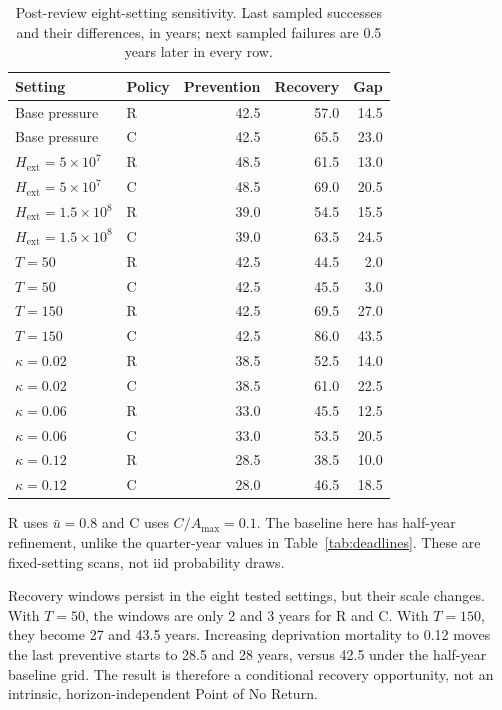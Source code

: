 \documentclass[12pt,a4paper]{article}
\theoremstyle{remark}
\newcommand{\Hext}{H_{\mathrm{ext}}}
\begin{document}
\begin{table}[htbp]\centering\small
\caption{Post-review eight-setting sensitivity. Last sampled successes and their differences, in years; next sampled failures are 0.5 years later in every row.}\label{tab:reviewsensitivity}
\begin{tabular}{@{}llrrr@{}}\toprule
Setting & Policy & Prevention & Recovery & Gap\\\midrule
Base pressure & R & 42.5 & 57.0 & 14.5\\
Base pressure & C & 42.5 & 65.5 & 23.0\\
$\Hext=5\times10^7$ & R & 48.5 & 61.5 & 13.0\\
$\Hext=5\times10^7$ & C & 48.5 & 69.0 & 20.5\\
$\Hext=1.5\times10^8$ & R & 39.0 & 54.5 & 15.5\\
$\Hext=1.5\times10^8$ & C & 39.0 & 63.5 & 24.5\\
$T=50$ & R & 42.5 & 44.5 & 2.0\\
$T=50$ & C & 42.5 & 45.5 & 3.0\\
$T=150$ & R & 42.5 & 69.5 & 27.0\\
$T=150$ & C & 42.5 & 86.0 & 43.5\\
$\kappa=0.02$ & R & 38.5 & 52.5 & 14.0\\
$\kappa=0.02$ & C & 38.5 & 61.0 & 22.5\\
$\kappa=0.06$ & R & 33.0 & 45.5 & 12.5\\
$\kappa=0.06$ & C & 33.0 & 53.5 & 20.5\\
$\kappa=0.12$ & R & 28.5 & 38.5 & 10.0\\
$\kappa=0.12$ & C & 28.0 & 46.5 & 18.5\\
\bottomrule\end{tabular}
\par\smallskip\begin{minipage}{0.96\linewidth}\footnotesize R uses $\bar u=0.8$ and C uses $C/A_{\max}=0.1$. The baseline here has half-year refinement, unlike the quarter-year values in Table~\ref{tab:deadlines}. These are fixed-setting scans, not iid probability draws.\end{minipage}
\end{table}

Recovery windows persist in the eight tested settings, but their scale changes. With $T=50$, the windows are only 2 and 3 years for R and C. With $T=150$, they become 27 and 43.5 years. Increasing deprivation mortality to 0.12 moves the last preventive starts to 28.5 and 28 years, versus 42.5 under the half-year baseline grid. The result is therefore a conditional recovery opportunity, not an intrinsic, horizon-independent Point of No Return.
\end{document}
